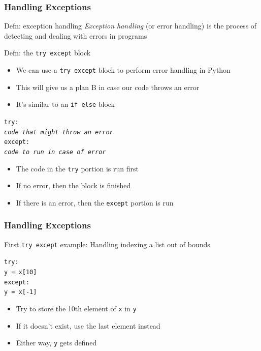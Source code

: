 \documentclass{beamer}
\newcommand{\code}[1]{\texttt{#1}}
\newcommand{\tab}{\hspace*{22pt}}
\begin{document}
\begin{frame}	
	\frametitle{Handling Exceptions}
	
	\begin{alertblock}{Defn: exception handling}
		\emph{Exception handling} (or error handling) is the process of detecting and dealing with errors in programs
	\end{alertblock}
	
	\begin{alertblock}{Defn: the \code{try except} block}
			\begin{itemize}
				\item We can use a \code{try except} block to perform error handling in Python
				\item This will give us a plan B in case our code throws an error
				\item It's similar to an \code{if else} block
			\end{itemize}
			
			\vspace{6pt}
			\code{try: \\
					\tab \emph{code that might throw an error} \\
					except: \\
					\tab \emph{code to run in case of error}
			}
		\endminipage\hfill
			\begin{itemize}
				\item The code in the \code{try} portion is run first
				\item If no error, then the block is finished
				\item If there is an error, then the \code{except} portion is run
			\end{itemize}
		\endminipage\hfill
	\end{alertblock}
	
\end{frame}

\begin{frame}	
	\frametitle{Handling Exceptions}
	
	\begin{block}{First \code{try except} example:}
			Handling indexing a list out of bounds
			
			\vspace{10pt}
			\code{try: \\
					\tab y = x[10] \\
					except: \\
					\tab y = x[-1]
			}
		\endminipage\hfill
			\begin{itemize}
				\item Try to store the 10th element of \code{x} in \code{y}
				\item If it doesn't exist, use the last element instead
				\item Either way, \code{y} gets defined
			\end{itemize}
		\endminipage\hfill
	\end{block}
	
\end{frame}
\end{document}
